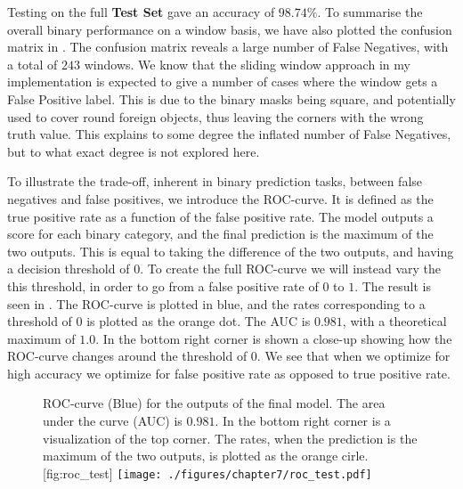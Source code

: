Testing on the full \textbf{Test Set} gave an accuracy of $98.74\%$. 
To summarise the overall binary performance on a window basis, we have also plotted the confusion matrix in . 
The confusion matrix reveals a large number of False Negatives, with a total of $243$ windows. We know that the sliding window approach in my implementation is expected to give a number of cases where the window gets a False Positive label. This is due to the binary masks being square, and potentially used to cover round foreign objects, thus leaving the corners with the wrong truth value. This explains to some degree the inflated number of False Negatives, but to what exact degree is not explored here.  %

To illustrate the trade-off, inherent in binary prediction tasks, between false negatives and false positives, we introduce the \ac{ROC-curve}.
It is defined as the true positive rate as a function of the false positive rate. 
The model outputs a score for each binary category, and the final prediction is the maximum of the two outputs. 
This is equal to taking the difference of the two outputs, and having a decision threshold of $0$. To create the full \ac{ROC-curve} we will instead vary the this threshold, in order to go from a false positive rate of $0$ to $1$.
The result is seen in . The \ac{ROC-curve} is plotted in blue, and the rates corresponding to a threshold of $0$ is plotted as the orange dot.
The \ac{AUC} is $0.981$, with a theoretical maximum of $1.0$. In the bottom right corner is shown a close-up showing how the \ac{ROC-curve} changes around the threshold of $0$.
We see that when we optimize for high accuracy we optimize for false positive rate as opposed to true positive rate. 

\begin{figure}[h]
	\begin{sidecaption}{\antimpjustification \ac{ROC-curve} (Blue) for the outputs of the final model. The area under the curve (AUC) is $0.981$. In the bottom right corner is a visualization of the top corner. 
	The rates, when the prediction is the maximum of the two outputs, is plotted as the orange cirle.
}[fig:roc_test]
		\antimpjustification
		\centering
		\texttt{[image: ./figures/chapter7/roc\_test.pdf]}
	\end{sidecaption}
\end{figure}
 
